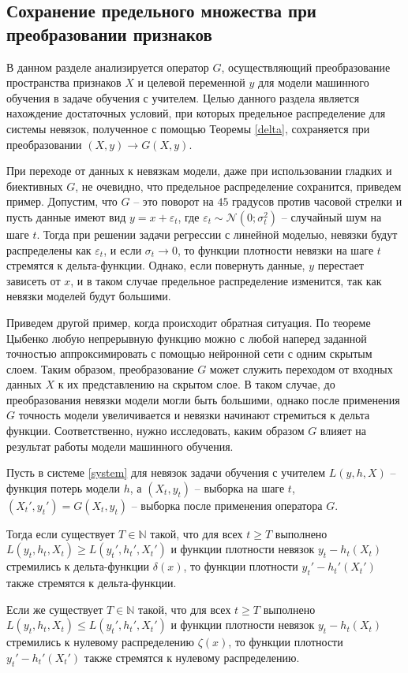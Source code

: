     \subsection{Сохранение предельного множества при преобразовании признаков}

        В данном разделе анализируется оператор $G$, осуществляющий преобразование пространства признаков $X$ и целевой переменной $y$ для модели машинного обучения в задаче обучения с учителем. Целью данного раздела является нахождение достаточных условий, при которых предельное распределение для системы невязок, полученное с помощью Теоремы \ref{delta}, сохраняется при преобразовании $(X, y) \to G(X, y)$. 

        При переходе от данных к невязкам модели, даже при использовании гладких и биективных $G$, не очевидно, что предельное распределение сохранится, приведем пример. Допустим, что $G$ -- это поворот на $45$ градусов против часовой стрелки и пусть данные имеют вид $y = x + \varepsilon_t$, где  $\varepsilon_t \sim \mathcal{N}(0; \sigma_t^2)$ -- случайный шум на шаге $t$. Тогда при решении задачи регрессии с линейной моделью, невязки будут распределены как $\varepsilon_t$, и если $\sigma_t \to 0$, то функции плотности невязки на шаге $t$ стремятся к дельта-функции. Однако, если повернуть данные, $y$ перестает зависеть от $x$, и в таком случае предельное распределение изменится, так как невязки моделей будут большими. 

        Приведем другой пример, когда происходит обратная ситуация. По теореме Цыбенко \cite{cybenko1989approximation} любую непрерывную функцию можно с любой наперед заданной точностью аппроксимировать с помощью нейронной сети с одним скрытым слоем. Таким образом, преобразование $G$ может служить переходом от входных данных $X$ к их представлению на скрытом слое. В таком случае, до преобразования невязки модели могли быть большими, однако после применения $G$ точность модели увеличивается и невязки начинают стремиться к дельта функции. Соответственно, нужно исследовать, каким образом $G$ влияет на результат работы модели машинного обучения.

        \begin{lemma} \label{loss}
            Пусть в системе \eqref{system} для невязок задачи обучения с учителем $L(y, h, X)$ -- функция потерь модели $h$, а $(X_t, y_t)$ -- выборка на шаге $t$, $(X_t', y_t') = G(X_t, y_t)$ – выборка после применения оператора $G$. 
            
	        Тогда если существует $T \in \mathbb{N}$ такой, что для всех $t \geq T$ выполнено $L(y_t, h_t, X_t) \geq L(y_t', h_t', X_t')$ и функции плотности невязок $y_t - h_t(X_t)$ стремились к дельта-функции $\delta(x)$, то функции плотности $y_t' - h_t'(X_t')$ также стремятся к дельта-функции. 
         
	        Если же существует $T \in \mathbb{N}$ такой, что для всех $t \geq T$ выполнено $L(y_t, h_t, X_t) \leq L(y_t', h_t', X_t')$ и функции плотности невязок $y_t - h_t(X_t)$ стремились к нулевому распределению $\zeta(x)$, то функции плотности $y_t' - h_t'(X_t')$ также стремятся к нулевому распределению. 
        \end{lemma}

